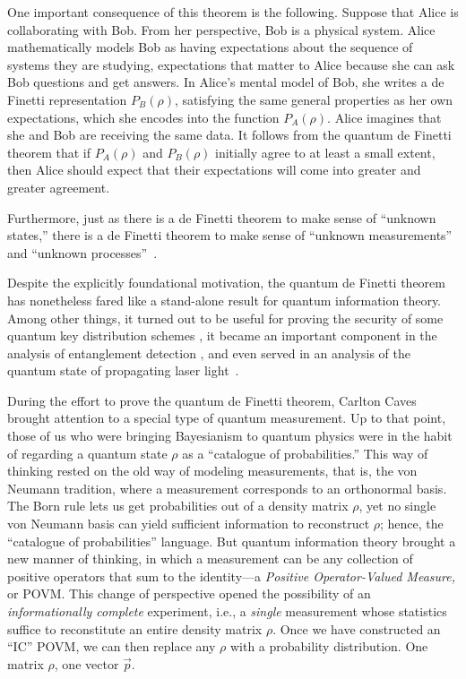 \documentclass[aps,pra,superscriptaddress,10pt,tightenlines,twocolumn,nofootinbib]{revtex4}
\begin{document}
One important consequence of this theorem is the following.  Suppose
that Alice is collaborating with Bob.  From her perspective, Bob is a
physical system.  Alice mathematically models Bob as having
expectations about the sequence of systems they are studying,
expectations that matter to Alice because she can ask Bob questions
and get answers.  In Alice's mental model of Bob, she writes a de
Finetti representation $P_B(\rho)$, satisfying the same general
properties as her own expectations, which she encodes into the
function $P_A(\rho)$.  Alice imagines that she and Bob are receiving
the same data.  It follows from the quantum de Finetti theorem that if
$P_A(\rho)$ and $P_B(\rho)$ initially agree to at least a small
extent, then Alice should expect that their expectations will come
into greater and greater agreement.

Furthermore, just as there is a de Finetti theorem to make sense of
``unknown states,'' there is a de Finetti theorem to make sense of
``unknown measurements'' and ``unknown processes''~\cite{Fuchs04c}.

Despite the explicitly foundational motivation, the quantum de Finetti theorem has nonetheless fared like a stand-alone result for quantum information theory.  Among other things, it turned out to be useful for proving the security of some quantum key distribution schemes \cite{Lo05,Renner07,Renner08}, it became an important component in the analysis of entanglement detection \cite{Doherty05,Enk07}, and even served in an analysis of the quantum state of propagating laser light~\cite{vanEnk02,vanEnk02b}.


During the effort to prove the quantum de Finetti theorem, Carlton Caves brought attention to a special type of quantum measurement.  Up to that point, those of us who were bringing Bayesianism to quantum physics were in the habit of regarding a quantum state $\rho$ as a ``catalogue of probabilities.''  This way of thinking rested on the old way of modeling measurements, that is, the von Neumann tradition, where a measurement corresponds to an orthonormal basis.  The Born rule lets us get probabilities out of a density matrix $\rho$, yet no single von Neumann basis can yield sufficient information to reconstruct $\rho$; hence, the ``catalogue of probabilities'' language.  But quantum information theory brought a new manner of thinking, in which a measurement can be any collection of positive operators that sum to the identity---a {\it Positive Operator-Valued Measure,} or POVM.  This change of perspective opened the possibility of an {\it informationally complete\/} experiment, i.e., a {\it single\/} measurement whose statistics suffice to reconstitute an entire density matrix $\rho$.  Once we have constructed an ``IC'' POVM, we can then replace any $\rho$ with a probability distribution.  One matrix $\rho$, one vector $\vec{p}$.
\end{document}
